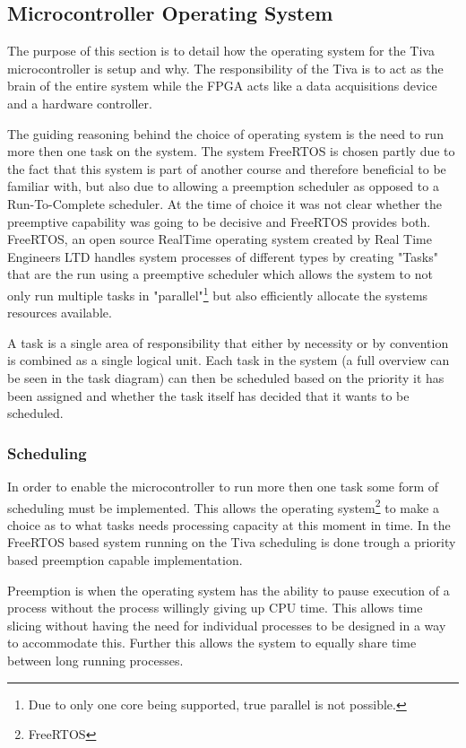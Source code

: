 \documentclass[../../../main]{subfiles}
\begin{document}
\subsection{Microcontroller Operating System}

The purpose of this section is to detail how the operating system for the Tiva microcontroller is setup and why. The responsibility of the Tiva is to act as the brain of the entire system while the FPGA acts like a data acquisitions device and a hardware controller. 

The guiding reasoning behind the choice of operating system is the need to run more then one task on the system. The system FreeRTOS is chosen partly due to the fact that this system is part of another course and therefore beneficial to be familiar with, but also due to allowing a preemption scheduler as opposed to a Run-To-Complete scheduler. At the time of choice it was not clear whether the preemptive capability was going to be decisive and FreeRTOS provides both.
\\

FreeRTOS, an open source RealTime operating system created by Real Time Engineers LTD handles system processes of different types by creating "Tasks" that are the run using a preemptive scheduler which allows the system to not only run multiple tasks in "parallel"\footnote{Due to only one core being supported, true parallel is not possible.} but also efficiently allocate the systems resources available.


A task is a single area of responsibility that either by necessity or by convention is combined as a single logical unit. Each task in the system (a full overview can be seen in the task diagram) can then be scheduled based on the priority it has been assigned and whether the task itself has decided that it wants to be scheduled. 

\subsubsection{Scheduling}

In order to enable the microcontroller to run more then one task some form of scheduling must be implemented. This allows the operating system\footnote{FreeRTOS} to make a choice as to what tasks needs processing capacity at this moment in time. In the FreeRTOS based system running on the Tiva scheduling is done trough a priority based preemption capable implementation.

Preemption is when the operating system has the ability to pause execution of a process without the process willingly giving up CPU time. This allows time slicing without having the need for individual processes to be designed in a way to accommodate this. Further this allows the system to equally share time between long running processes. 
\end{document}

